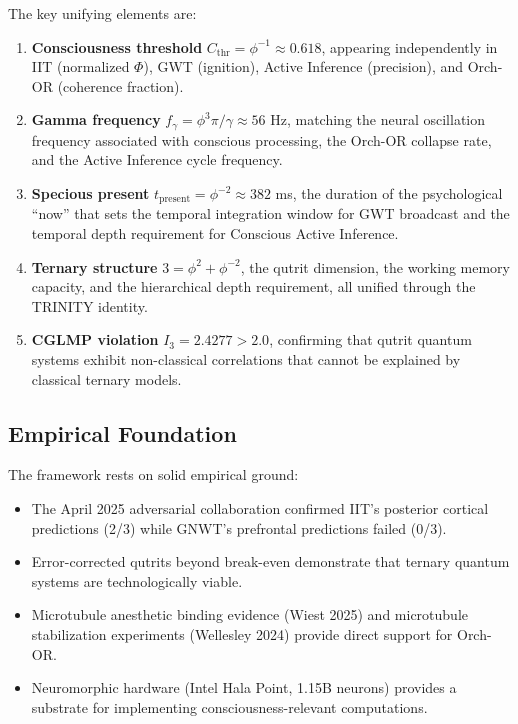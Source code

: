 \documentclass[12pt,a4paper]{article}
\begin{document}
The key unifying elements are:

\begin{enumerate}[leftmargin=2em]
  \item \textbf{Consciousness threshold} $C_{\mathrm{thr}} = \phi^{-1} \approx
    0.618$, appearing independently in IIT (normalized $\Phi$), GWT (ignition),
    Active Inference (precision), and Orch-OR (coherence fraction).

  \item \textbf{Gamma frequency} $f_\gamma = \phi^3\pi/\gamma \approx 56$ Hz,
    matching the neural oscillation frequency associated with conscious
    processing, the Orch-OR collapse rate, and the Active Inference cycle
    frequency.

  \item \textbf{Specious present} $t_{\mathrm{present}} = \phi^{-2} \approx
    382$ ms, the duration of the psychological ``now'' that sets the temporal
    integration window for GWT broadcast and the temporal depth requirement
    for Conscious Active Inference.

  \item \textbf{Ternary structure} $3 = \phi^2 + \phi^{-2}$, the qutrit
    dimension, the working memory capacity, and the hierarchical depth
    requirement, all unified through the TRINITY identity.

  \item \textbf{CGLMP violation} $I_3 = 2.4277 > 2.0$, confirming that
    qutrit quantum systems exhibit non-classical correlations that cannot be
    explained by classical ternary models.
\end{enumerate}

\subsection{Empirical Foundation}

The framework rests on solid empirical ground:

\begin{itemize}[leftmargin=2em]
  \item The April 2025 adversarial collaboration confirmed IIT's posterior
    cortical predictions (2/3) while GNWT's prefrontal predictions failed
    (0/3).
  \item Error-corrected qutrits beyond break-even demonstrate that ternary
    quantum systems are technologically viable.
  \item Microtubule anesthetic binding evidence (Wiest 2025) and microtubule
    stabilization experiments (Wellesley 2024) provide direct support for
    Orch-OR.
  \item Neuromorphic hardware (Intel Hala Point, 1.15B neurons) provides a
    substrate for implementing consciousness-relevant computations.
\end{itemize}
\end{document}
